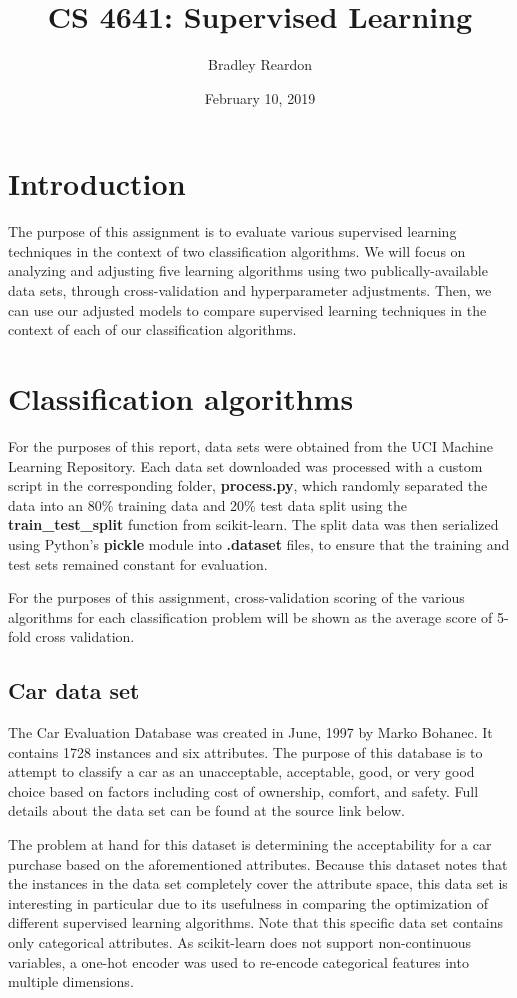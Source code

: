 \documentclass{article}
\title{\textbf{CS 4641:} Supervised Learning}
\author{Bradley Reardon}
\date{February 10, 2019}
\begin{document}
    \maketitle

    \section{Introduction}
    The purpose of this assignment is to evaluate various supervised learning techniques in the context of two classification algorithms. We will focus on analyzing and adjusting five learning algorithms using two publically-available data sets, through cross-validation and hyperparameter adjustments. Then, we can use our adjusted models to compare supervised learning techniques in the context of each of our classification algorithms.

    \section{Classification algorithms}
    For the purposes of this report, data sets were obtained from the UCI Machine Learning Repository. Each data set downloaded was processed with a custom script in the corresponding folder, \textbf{process.py}, which randomly separated the data into an 80\% training data and 20\% test data split using the \textbf{train\_test\_split} function from scikit-learn. The split data was then serialized using Python's \textbf{pickle} module into \textbf{.dataset} files, to ensure that the training and test sets remained constant for evaluation.

    For the purposes of this assignment, cross-validation scoring of the various algorithms for each classification problem will be shown as the average score of 5-fold cross validation.

    \subsection{Car data set}
    The Car Evaluation Database was created in June, 1997 by Marko Bohanec. It contains 1728 instances and six attributes. The purpose of this database is to attempt to classify a car as an unacceptable, acceptable, good, or very good choice based on factors including cost of ownership, comfort, and safety. Full details about the data set can be found at the source link below.

    The problem at hand for this dataset is determining the acceptability for a car purchase based on the aforementioned attributes. Because this dataset notes that the instances in the data set completely cover the attribute space, this data set is interesting in particular due to its usefulness in comparing the optimization of different supervised learning algorithms. Note that this specific data set contains only categorical attributes. As scikit-learn does not support non-continuous variables, a one-hot encoder was used to re-encode categorical features into multiple dimensions.
\end{document}

